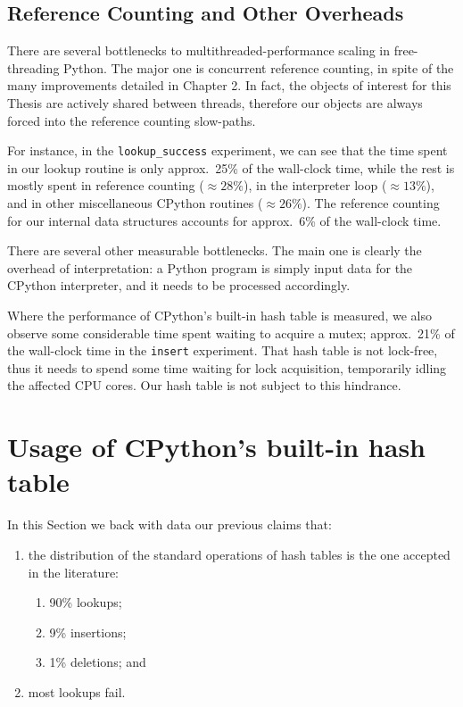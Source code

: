 \subsection{Reference Counting and Other Overheads}\label{subsec:measurements-overheads}

There are several bottlenecks to multithreaded-performance scaling in free-threading Python.
The major one is concurrent reference counting, in spite of the many improvements detailed in Chapter 2.
In fact, the objects of interest for this Thesis are actively shared between threads, therefore our objects are always forced into the reference counting slow-paths.

For instance, in the \texttt{lookup\_success} experiment, we can see that the time spent in our lookup routine is only approx.\ 25\% of the wall-clock time, while the rest is mostly spent in reference counting ($\approx28\%$), in the interpreter loop ($\approx13\%$), and in other miscellaneous CPython routines ($\approx26\%$).
The reference counting for our internal data structures accounts for approx.\ 6\% of the wall-clock time.

There are several other measurable bottlenecks.
The main one is clearly the overhead of interpretation: a Python program is simply input data for the CPython interpreter, and it needs to be processed accordingly.

Where the performance of CPython's built-in hash table is measured, we also observe some considerable time spent waiting to acquire a mutex; approx.\ 21\% of the wall-clock time in the \texttt{insert} experiment.
That hash table is not lock-free, thus it needs to spend some time waiting for lock acquisition, temporarily idling the affected CPU cores.
Our hash table is not subject to this hindrance.


\section{Usage of CPython's built-in hash table}\label{sec:dict-metrics}

In this Section we back with data our previous claims that:
\begin{enumerate}
    \item the distribution of the standard operations of hash tables is the one accepted in the literature:
    \begin{enumerate}
        \item 90\% lookups;
        \item 9\% insertions;
        \item 1\% deletions; and
    \end{enumerate}
    \item most lookups fail.
\end{enumerate}

